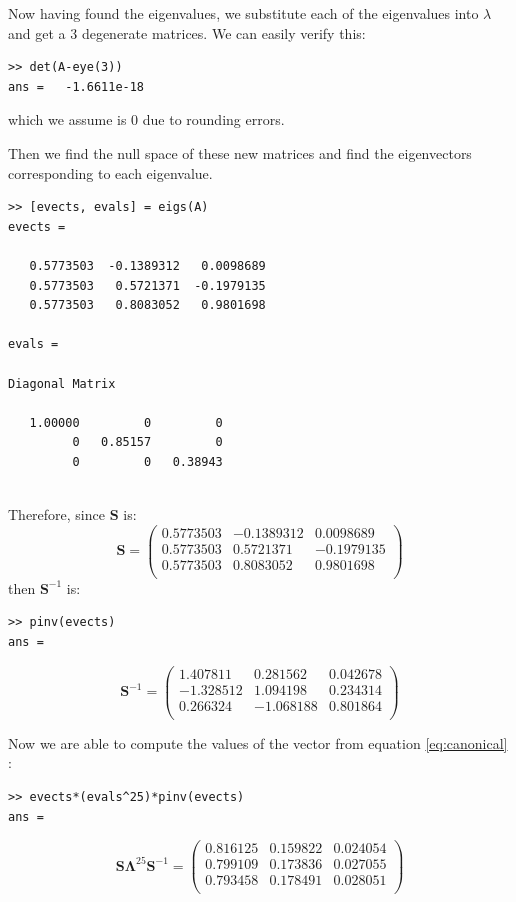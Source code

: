 \documentclass[a4paper,12pt]{article}
\theoremstyle{definition}
\begin{document}
Now having found the eigenvalues, we substitute each of the eigenvalues into $\lambda$ and get a 3 degenerate matrices. We can easily verify this:
\begin{lstlisting}
>> det(A-eye(3))
ans =   -1.6611e-18
\end{lstlisting}
which we assume is $0$ due to rounding errors. 

Then we find the null space of these new matrices and find the eigenvectors corresponding to each eigenvalue. 
\begin{lstlisting}
>> [evects, evals] = eigs(A)
evects =

   0.5773503  -0.1389312   0.0098689
   0.5773503   0.5721371  -0.1979135
   0.5773503   0.8083052   0.9801698

evals =

Diagonal Matrix

   1.00000         0         0
         0   0.85157         0
         0         0   0.38943


\end{lstlisting}
Therefore, since $\mathbf{S}$ is:
\begin{equation*}
\mathbf{S} = \left(\begin{array}{ccc}
   0.5773503 &-0.1389312 & 0.0098689 \\
   0.5773503 & 0.5721371 &-0.1979135 \\
   0.5773503 & 0.8083052 & 0.9801698 \\

\end{array}\right)
\end{equation*}
then $\mathbf{S}^{-1}$ is:
\begin{lstlisting}
>> pinv(evects)
ans =
\end{lstlisting}

\begin{equation}
\mathbf{S}^{-1} = \left(\begin{array}{ccc}
1.407811   &0.281562   &0.042678 \\
-1.328512   &1.094198   &0.234314 \\
0.266324  &-1.068188   &0.801864 \\
\end{array}\right)
\end{equation}

Now we are able to compute the values of the vector from equation \ref{eq:canonical} : 
\begin{lstlisting}
>> evects*(evals^25)*pinv(evects)
ans =

\end{lstlisting}
\begin{equation}
\mathbf{S}\mathbf{\Lambda}^{25}\mathbf{S}^{-1} = \left(\begin{array}{ccc}
   0.816125   &0.159822   &0.024054 \\
   0.799109   &0.173836   &0.027055 \\
   0.793458   &0.178491   &0.028051 \\
\end{array}\right)
\end{equation}
\end{document}

